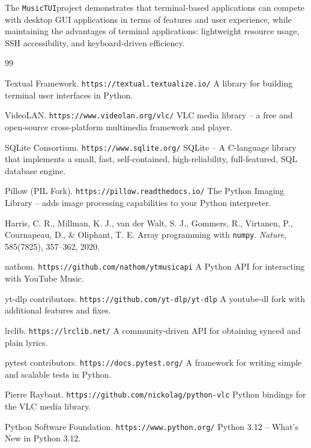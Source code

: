 \documentclass[a4paper,11pt,twoside]{article}
\newcommand{\musictui}{\texttt{MusicTUI}}
\begin{document}
The \musictui project demonstrates that terminal-based applications can
compete with desktop GUI applications in terms of features and user
experience, while maintaining the advantages of terminal applications:
lightweight resource usage, SSH accessibility, and keyboard-driven
efficiency.

\begin{thebibliography}{99}

Textual Framework.
\newblock \texttt{https://textual.textualize.io/}
\newblock A library for building terminal user interfaces in Python.

VideoLAN.
\newblock \texttt{https://www.videolan.org/vlc/}
\newblock VLC media library -- a free and open-source cross-platform multimedia
framework and player.

SQLite Consortium.
\newblock \texttt{https://www.sqlite.org/}
\newblock SQLite -- A C-language library that implements a small, fast,
self-contained, high-reliability, full-featured, SQL database engine.

Pillow (PIL Fork).
\newblock \texttt{https://pillow.readthedocs.io/}
\newblock The Python Imaging Library -- adds image processing capabilities to
your Python interpreter.

Harris, C. R., Millman, K. J., van der Walt, S. J., Gommers, R., Virtanen, P.,
Cournapeau, D., \& Oliphant, T. E.
\newblock Array programming with \texttt{numpy}.
\newblock \emph{Nature}, 585(7825), 357--362, 2020.

nathom.
\newblock \texttt{https://github.com/nathom/ytmusicapi}
\newblock A Python API for interacting with YouTube Music.

yt-dlp contributors.
\newblock \texttt{https://github.com/yt-dlp/yt-dlp}
\newblock A youtube-dl fork with additional features and fixes.

lrclib.
\newblock \texttt{https://lrclib.net/}
\newblock A community-driven API for obtaining synced and plain lyrics.

pytest contributors.
\newblock \texttt{https://docs.pytest.org/}
\newblock A framework for writing simple and scalable tests in Python.

Pierre Raybaut.
\newblock \texttt{https://github.com/nickolag/python-vlc}
\newblock Python bindings for the VLC media library.

Python Software Foundation.
\newblock \texttt{https://www.python.org/}
\newblock Python 3.12 -- What's New in Python 3.12.

\end{thebibliography}
\end{document}
